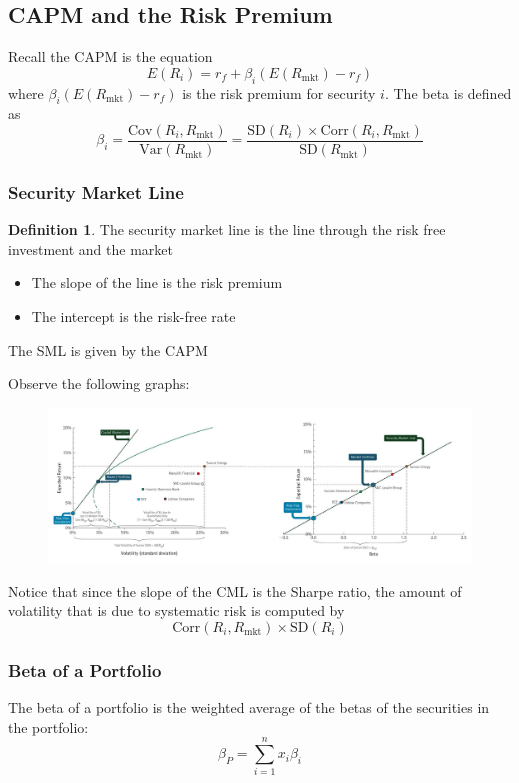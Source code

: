 \documentclass[11pt]{article}
\theoremstyle{definition}
\newtheorem*{definition}{Definition}
\newcommand{\Var}{\text{Var}}
\newcommand{\Cov}{\text{Cov}}
\newcommand{\Sd}{\text{SD}}
\newcommand{\Corr}{\text{Corr}}
\begin{document}
\subsection{CAPM and the Risk Premium}
Recall the CAPM is the equation
\begin{equation*}
    E(R_i) = r_f + \beta_i (E(R_{\text{mkt}}) - r_f)
\end{equation*}
where $\beta_i (E(R_{\text{mkt}}) - r_f)$ is the risk premium for security $i$. The beta is defined as 
\begin{equation*}
    \beta_i = \frac{\Cov(R_i, R_{\text{mkt}})}{\Var(R_{\text{mkt}})} = \frac{\Sd(R_i) \times \Corr(R_i, R_{\text{mkt}})}{\Sd(R_{\text{mkt}})}
\end{equation*}
\subsubsection{Security Market Line}
\begin{definition}
    The security market line is the line through the risk free investment and the market
    \begin{itemize}
        \item The slope of the line is the risk premium
        \item The intercept is the risk-free rate
    \end{itemize}
    The SML is given by the CAPM
\end{definition}
Observe the following graphs:
\begin{figure}[h]
    \centering
    \includegraphics[scale=0.30]{Screenshot 2023-10-29 at 16.06.47.png}
\end{figure}

Notice that since the slope of the CML is the Sharpe ratio, the amount of volatility that is due to systematic risk is computed by 
\begin{equation*}
    \Corr(R_i, R_{\text{mkt}}) \times \Sd(R_i)
\end{equation*}
\subsubsection{Beta of a Portfolio}
The beta of a portfolio is the weighted average of the betas of the securities in the portfolio:
\begin{equation*}
    \beta_P = \sum_{i=1}^n x_i \beta_i
\end{equation*}
\end{document}

